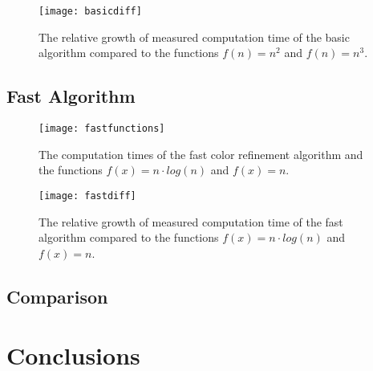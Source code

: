\documentclass[twoside]{article}
\begin{document}
\begin{multicols}{2}
\begin{figure}[H]
	\texttt{[image: basicdiff]}
	\caption{The relative growth of measured computation time of the basic algorithm compared to the functions $f(n)=n^2$ and $f(n)=n^3$.}
	\label{fig:basicgrowth}
\end{figure}

\subsection{Fast Algorithm}

\begin{figure}[H]
	\texttt{[image: fastfunctions]}
	\caption{The computation times of the fast color refinement algorithm and the functions $f(x)=n\cdot log(n)$ and $f(x)=n$.}
	\label{fig:fastgrowth}
\end{figure}

\begin{figure}[H]
	\texttt{[image: fastdiff]}
	\caption{The relative growth of measured computation time of the fast algorithm compared to the functions $f(x)=n\cdot log(n)$ and $f(x)=n$.}
	\label{fig:fastfunctions}
\end{figure}

\subsection{Comparison}

\section{Conclusions}
\label{concl}

\label{references}
\printbibliography


\end{multicols}
\end{document}
